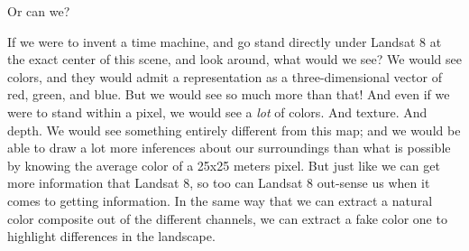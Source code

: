 \documentclass[
  letterpaper,
]{scrbook}
\begin{document}
Or can we?

If we were to invent a time machine, and go stand directly under Landsat
8 at the exact center of this scene, and look around, what would we see?
We would see colors, and they would admit a representation as a
three-dimensional vector of red, green, and blue. But we would see so
much more than that! And even if we were to stand within a pixel, we
would see a \emph{lot} of colors. And texture. And depth. We would see
something entirely different from this map; and we would be able to draw
a lot more inferences about our surroundings than what is possible by
knowing the average color of a 25x25 meters pixel. But just like we can
get more information that Landsat 8, so too can Landsat 8 out-sense us
when it comes to getting information. In the same way that we can
extract a natural color composite out of the different channels, we can
extract a fake color one to highlight differences in the landscape.
\end{document}

